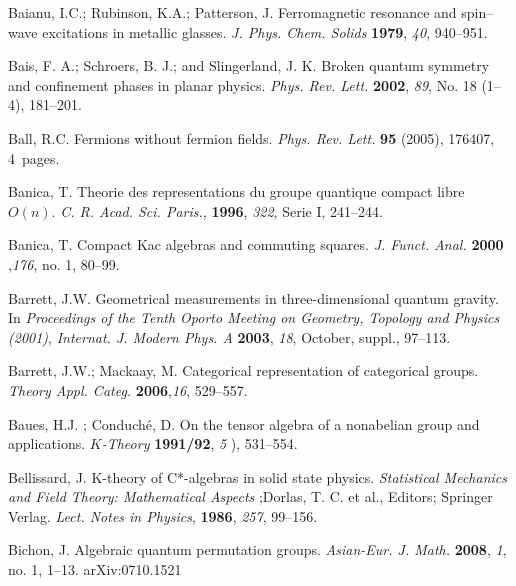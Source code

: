 \documentclass[12pt]{article}
\theoremstyle{plain}
\theoremstyle{definition}
\numberwithin{equation}{section}
\begin{document}
\begin{thebibliography}{99}
Baianu, I.C.; Rubinson, K.A.; Patterson, J. Ferromagnetic resonance and spin--wave excitations in metallic glasses. \emph{J. Phys. Chem. Solids} {\bf 1979}, {\em 40}, 940--951.

Bais, F. A.; Schroers, B. J.; and Slingerland, J. K. Broken quantum symmetry and confinement phases in planar physics. \emph{Phys. Rev. Lett.} \textbf{2002}, {\em 89}, No. 18 (1--4), 181--201.


Ball, R.C. Fermions without fermion fields. {\em Phys. Rev. Lett.} \textbf{95} (2005), 176407, 4~pages.


Banica, T. Theorie des representations du groupe quantique compact libre $O (n)$. {\em C. R. Acad. Sci. Paris.}, {\bf 1996}, {\em 322}, Serie I, 241--244.

Banica, T. Compact Kac algebras and commuting squares. {\em J. Funct. Anal.} {\bf 2000} ,{\em 176}, no. 1, 80--99.

Barrett, J.W. Geometrical measurements in three-dimensional quantum gravity. In {\em Proceedings of the Tenth Oporto Meeting on Geometry, Topology and Physics (2001)}, \textit{Internat. J. Modern Phys. A} {\bf 2003}, {\em 18}, October, suppl., 97--113.


Barrett, J.W.; Mackaay, M. Categorical representation of categorical groups. {\em Theory Appl. Categ.} {\bf 2006},{\em 16}, 529--557.

Baues, H.J. ; Conduch\'{e}, D. On the tensor algebra of a nonabelian group and applications. {\em $K$-Theory} {\bf 1991/92}, {\em 5} ), 531--554.

Bellissard, J. K-theory of C*-algebras in solid state physics. {\em Statistical Mechanics and Field Theory: Mathematical Aspects}
;Dorlas, T. C. et al., Editors; Springer Verlag. {\em Lect. Notes in Physics}, {\bf 1986}, {\em 257}, 99--156.

Bichon, J. Algebraic quantum permutation groups. {\em Asian-Eur. J. Math.} {\bf 2008}, {\em 1}, no. 1, 1--13. arXiv:0710.1521


\end{thebibliography}
\end{document}
